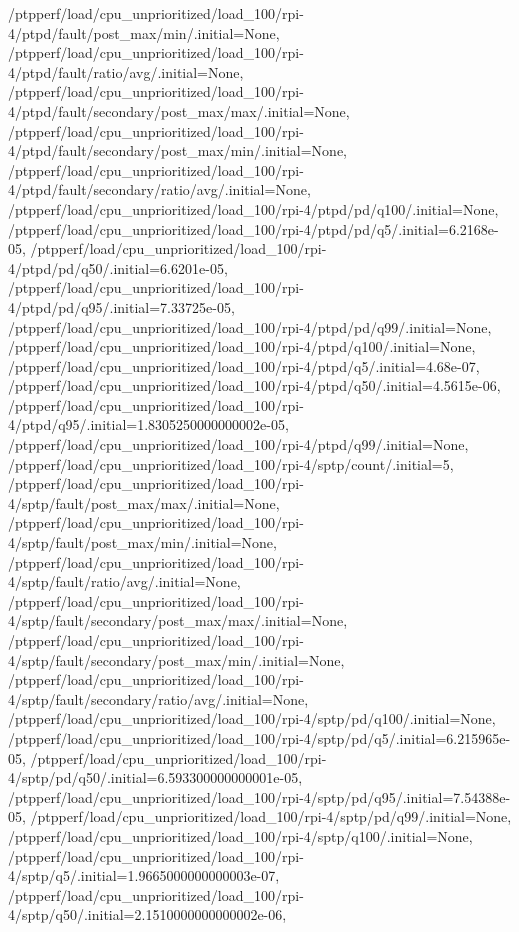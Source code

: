{    /ptpperf/load/cpu_unprioritized/load_100/rpi-4/ptpd/fault/post_max/min/.initial=None,
    /ptpperf/load/cpu_unprioritized/load_100/rpi-4/ptpd/fault/ratio/avg/.initial=None,
    /ptpperf/load/cpu_unprioritized/load_100/rpi-4/ptpd/fault/secondary/post_max/max/.initial=None,
    /ptpperf/load/cpu_unprioritized/load_100/rpi-4/ptpd/fault/secondary/post_max/min/.initial=None,
    /ptpperf/load/cpu_unprioritized/load_100/rpi-4/ptpd/fault/secondary/ratio/avg/.initial=None,
    /ptpperf/load/cpu_unprioritized/load_100/rpi-4/ptpd/pd/q100/.initial=None,
    /ptpperf/load/cpu_unprioritized/load_100/rpi-4/ptpd/pd/q5/.initial=6.2168e-05,
    /ptpperf/load/cpu_unprioritized/load_100/rpi-4/ptpd/pd/q50/.initial=6.6201e-05,
    /ptpperf/load/cpu_unprioritized/load_100/rpi-4/ptpd/pd/q95/.initial=7.33725e-05,
    /ptpperf/load/cpu_unprioritized/load_100/rpi-4/ptpd/pd/q99/.initial=None,
    /ptpperf/load/cpu_unprioritized/load_100/rpi-4/ptpd/q100/.initial=None,
    /ptpperf/load/cpu_unprioritized/load_100/rpi-4/ptpd/q5/.initial=4.68e-07,
    /ptpperf/load/cpu_unprioritized/load_100/rpi-4/ptpd/q50/.initial=4.5615e-06,
    /ptpperf/load/cpu_unprioritized/load_100/rpi-4/ptpd/q95/.initial=1.8305250000000002e-05,
    /ptpperf/load/cpu_unprioritized/load_100/rpi-4/ptpd/q99/.initial=None,
    /ptpperf/load/cpu_unprioritized/load_100/rpi-4/sptp/count/.initial=5,
    /ptpperf/load/cpu_unprioritized/load_100/rpi-4/sptp/fault/post_max/max/.initial=None,
    /ptpperf/load/cpu_unprioritized/load_100/rpi-4/sptp/fault/post_max/min/.initial=None,
    /ptpperf/load/cpu_unprioritized/load_100/rpi-4/sptp/fault/ratio/avg/.initial=None,
    /ptpperf/load/cpu_unprioritized/load_100/rpi-4/sptp/fault/secondary/post_max/max/.initial=None,
    /ptpperf/load/cpu_unprioritized/load_100/rpi-4/sptp/fault/secondary/post_max/min/.initial=None,
    /ptpperf/load/cpu_unprioritized/load_100/rpi-4/sptp/fault/secondary/ratio/avg/.initial=None,
    /ptpperf/load/cpu_unprioritized/load_100/rpi-4/sptp/pd/q100/.initial=None,
    /ptpperf/load/cpu_unprioritized/load_100/rpi-4/sptp/pd/q5/.initial=6.215965e-05,
    /ptpperf/load/cpu_unprioritized/load_100/rpi-4/sptp/pd/q50/.initial=6.593300000000001e-05,
    /ptpperf/load/cpu_unprioritized/load_100/rpi-4/sptp/pd/q95/.initial=7.54388e-05,
    /ptpperf/load/cpu_unprioritized/load_100/rpi-4/sptp/pd/q99/.initial=None,
    /ptpperf/load/cpu_unprioritized/load_100/rpi-4/sptp/q100/.initial=None,
    /ptpperf/load/cpu_unprioritized/load_100/rpi-4/sptp/q5/.initial=1.9665000000000003e-07,
    /ptpperf/load/cpu_unprioritized/load_100/rpi-4/sptp/q50/.initial=2.1510000000000002e-06,
}
